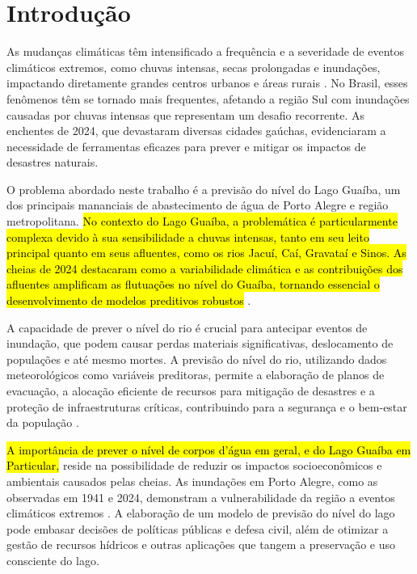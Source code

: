 \chapter{Introdução}
As mudanças climáticas têm intensificado a frequência e a severidade de eventos climáticos extremos, como chuvas intensas, secas prolongadas e inundações, impactando diretamente grandes centros urbanos e áreas rurais \cite{veja2024}. No Brasil, esses fenômenos têm se tornado mais frequentes, afetando a região Sul com inundações causadas por chuvas intensas que representam um desafio recorrente. As enchentes de 2024, que devastaram diversas cidades gaúchas, evidenciaram a necessidade de ferramentas eficazes para prever e mitigar os impactos de desastres naturais.

O problema abordado neste trabalho é a previsão do nível do Lago Guaíba, um dos principais mananciais de abastecimento de água de Porto Alegre e região metropolitana. \hl{No contexto do Lago Guaíba, a problemática é particularmente complexa devido à sua sensibilidade a chuvas intensas, tanto em seu leito principal quanto em seus afluentes, como os rios Jacuí, Caí, Gravataí e Sinos. As cheias de 2024 destacaram como a variabilidade climática e as contribuições dos afluentes amplificam as flutuações no nível do Guaíba, tornando essencial o desenvolvimento de modelos preditivos robustos} \cite{veja2024}.

A capacidade de prever o nível do rio é crucial para antecipar eventos de inundação, que podem causar perdas materiais significativas, deslocamento de populações e até mesmo mortes. A previsão do nível do rio, utilizando dados meteorológicos como variáveis preditoras, permite a elaboração de planos de evacuação, a alocação eficiente de recursos para mitigação de desastres e a proteção de infraestruturas críticas, contribuindo para a segurança e o bem-estar da população \cite{andrade2017}.

\hl{A importância de prever o nível de corpos d'água em geral, e do Lago Guaíba em Particular,} reside na possibilidade de reduzir os impactos socioeconômicos e ambientais causados pelas cheias. As inundações em Porto Alegre, como as observadas em 1941 e 2024, demonstram a vulnerabilidade da região a eventos climáticos extremos \cite{veja2024}. A elaboração de um modelo de previsão do nível do lago pode embasar decisões de políticas públicas e defesa civil, além de otimizar a gestão de recursos hídricos e outras aplicações que tangem a preservação e uso consciente do lago.

